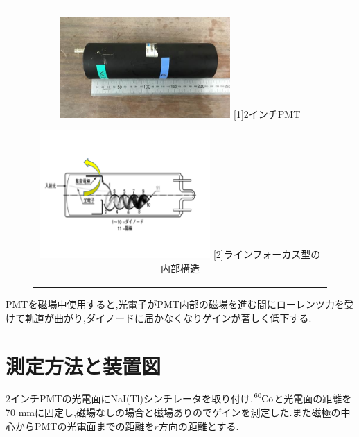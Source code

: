 \begin{figure}[htbp]
  \begin{center}
    \begin{tabular}{c}
      \begin{minipage}[t]{0.5\hsize}    
        \begin{center}
          \includegraphics[width=6.5cm]{fig/iguchi/PMTphoto.jpg}
	\hspace{1cm}[1]2インチPMT
     \end{center}
    \end{minipage}
      \begin{minipage}[t]{0.5\hsize}    
        \begin{center}
          \includegraphics[width=6.5cm]{fig/iguchi/PMTinner.pdf}
         \hspace{2cm}[2]ラインフォーカス型の内部構造
         \end{center}
        \end{minipage}
     
     \end{tabular}
     \label{PMT12}
    \end{center}
   \end{figure}

PMTを磁場中使用すると,光電子がPMT内部の磁場を進む間にローレンツ力を受けて軌道が曲がり,ダイノードに届かなくなりゲインが著しく低下する.


\section{測定方法と装置図}
2インチPMTの光電面にNaI(Tl)シンチレータを取り付け,$\ce{^{60}Co}$と光電面の距離を70 mmに固定し,磁場なしの場合と磁場ありのでゲインを測定した.また磁極の中心からPMTの光電面までの距離を$r$方向の距離とする.

